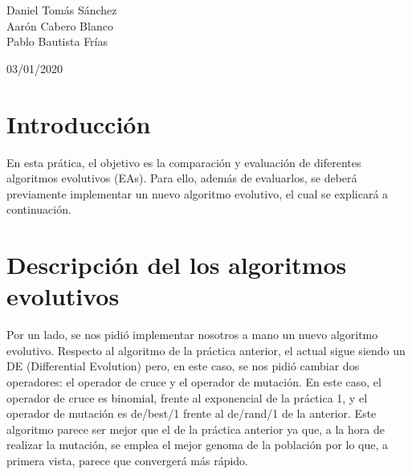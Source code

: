 \documentclass[11pt, a4paper, titlepage]{article}
\begin{document}
	\begin{titlepage}
    	\begin{center}
        	\hrulefill

        	\vspace{0.5cm}
        	{\bf\fontsize{25}{0}{\selectfont{Optimización Heurística\\[0.5cm]}}}
        	\fontsize{15}{0}{\selectfont{Evaluación de EAs\\[0.5cm]}}
        	\hrulefill
        	\vspace{6.0cm}
    	\end{center}

    	\centering
    	{\Large Daniel Tomás Sánchez\\ Aarón Cabero Blanco \\ Pablo Bautista 				Frías \par}
    	\vspace{2cm}
    	{\Large 03/01/2020 \par}
	\end{titlepage}

\newpage


\tableofcontents

\newpage

\section{Introducción}
En esta prática, el objetivo es la comparación y evaluación de diferentes algoritmos evolutivos (EAs). Para ello, además de evaluarlos, se deberá previamente  implementar un nuevo algoritmo evolutivo, el cual se explicará a continuación.
\section{Descripción del los algoritmos evolutivos}
Por un lado, se nos pidió implementar nosotros a mano un nuevo algoritmo evolutivo. Respecto al algoritmo de la práctica anterior, el actual sigue siendo un DE (Differential Evolution) pero, en este caso, se nos pidió cambiar dos operadores: el operador de cruce y el operador de mutación. En este caso, el operador de cruce es binomial, frente al exponencial de la práctica 1, y el operador de mutación es de/best/1 frente al de/rand/1 de la anterior. Este algoritmo parece ser mejor que el de la práctica anterior ya que, a la hora de realizar la mutación, se emplea el mejor genoma de la población por lo que, a primera vista, parece que convergerá más rápido.
\end{document}
